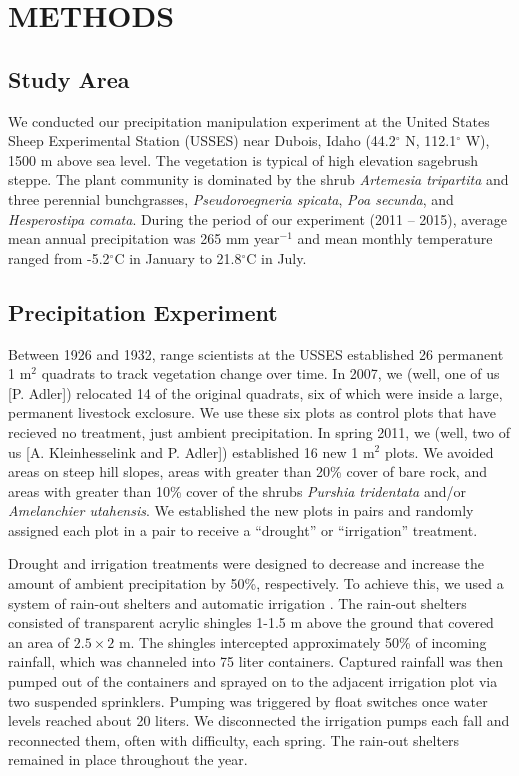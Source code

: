\documentclass[fleqn,10pt,lineno]{wlpeerj} %
\begin{document}
\section{METHODS}\label{methods}

\subsection{Study Area}\label{study-area}

We conducted our precipitation manipulation experiment at the United
States Sheep Experimental Station (USSES) near Dubois, Idaho
(44.2\(^{\circ}\) N, 112.1\(^{\circ}\) W), 1500 m above sea level. The
vegetation is typical of high elevation sagebrush steppe. The plant
community is dominated by the shrub \emph{Artemesia tripartita} and
three perennial bunchgrasses, \emph{Pseudoroegneria spicata}, \emph{Poa
secunda}, and \emph{Hesperostipa comata}. During the period of our
experiment (2011 -- 2015), average mean annual precipitation was 265 mm
year\(\phantom{}^{-1}\) and mean monthly temperature ranged from
-5.2\(^{\circ}\)C in January to 21.8\(^{\circ}\)C in July.

\subsection{Precipitation Experiment}\label{precipitation-experiment}

Between 1926 and 1932, range scientists at the USSES established 26
permanent 1 m\(^2\) quadrats to track vegetation change over time. In
2007, we (well, one of us {[}P. Adler{]}) relocated 14 of the original
quadrats, six of which were inside a large, permanent livestock
exclosure. We use these six plots as control plots that have recieved no
treatment, just ambient precipitation. In spring 2011, we (well, two of
us {[}A. Kleinhesselink and P. Adler{]}) established 16 new 1 m\(^2\)
plots. We avoided areas on steep hill slopes, areas with greater than
20\% cover of bare rock, and areas with greater than 10\% cover of the
shrubs \emph{Purshia tridentata} and/or \emph{Amelanchier utahensis}. We
established the new plots in pairs and randomly assigned each plot in a
pair to receive a ``drought'' or ``irrigation'' treatment.

Drought and irrigation treatments were designed to decrease and increase
the amount of ambient precipitation by 50\%, respectively. To achieve
this, we used a system of rain-out shelters and automatic irrigation
\citep{Gherardi2013}. The rain-out shelters consisted of transparent
acrylic shingles 1-1.5 m above the ground that covered an area of
\(2.5\times2\) m. The shingles intercepted approximately 50\% of
incoming rainfall, which was channeled into 75 liter containers.
Captured rainfall was then pumped out of the containers and sprayed on
to the adjacent irrigation plot via two suspended sprinklers. Pumping
was triggered by float switches once water levels reached about 20
liters. We disconnected the irrigation pumps each fall and reconnected
them, often with difficulty, each spring. The rain-out shelters remained
in place throughout the year.
\end{document}
